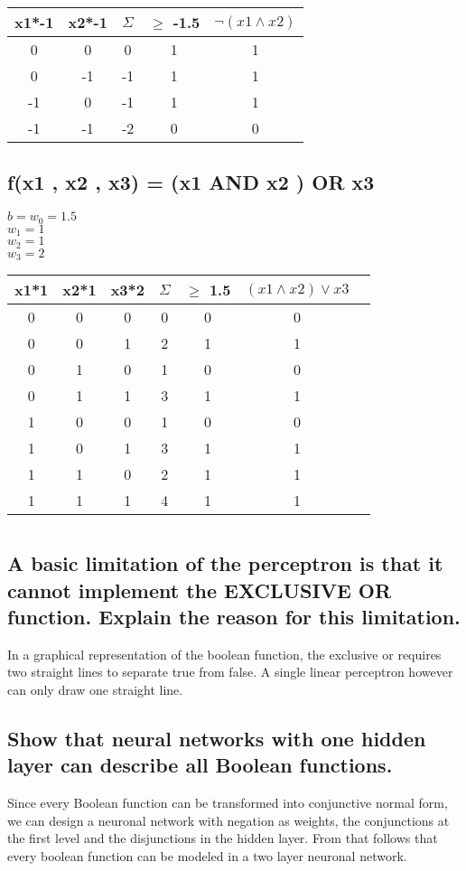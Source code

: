 \documentclass{scrartcl}
\begin{document}
\begin{tabular}{cc|c|c|c}
x1*-1 & x2*-1 & $\Sigma$ &$\geq$ -1.5 & $\neg(x1 \land x2)$\\\hline
0&0&0&1&1\\
0&-1&-1&1&1\\
-1&0&-1&1&1\\
-1&-1&-2&0&0
\end{tabular}


\subsection{f(x1 , x2 , x3) = (x1 AND x2 ) OR x3}
$b = w_{0} = 1.5$\\
$w_{1} = 1$\\
$w_{2} = 1$\\
$w_{3} = 2$\\

\begin{tabular}{ccc|c|c|c|c}
x1*1 & x2*1 & x3*2 &$\Sigma$ &$\geq$ 1.5 & $(x1 \land x2)\lor x3$\\\hline
0&0&0&	0&0&0\\
0&0&1&	2&1&1\\
0&1&0&	1&0&0\\
0&1&1&	3&1&1\\
1&0&0&	1&0&0\\
1&0&1&	3&1&1\\
1&1&0&	2&1&1\\
1&1&1&	4&1&1\\

\end{tabular}

\newpage
\section{}
\subsection{A basic limitation of the perceptron is that it cannot implement the EXCLUSIVE OR
function. Explain the reason for this limitation.}
In a graphical representation of the boolean function, the exclusive or requires two straight lines to separate true from false. A single linear perceptron however can only draw one straight line.

\subsection{Show that neural networks with one hidden layer can describe all Boolean functions.}
Since every Boolean function can be transformed into conjunctive normal form, we can design a neuronal network with negation as weights, the conjunctions at the first level and the disjunctions in the hidden layer. From that follows that every boolean function can be modeled in a two layer neuronal network.
\end{document}
